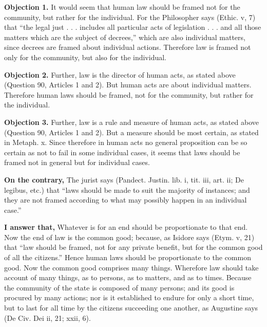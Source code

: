 
\textbf{Objection 1.} It would seem that human law should be framed not for the community, but rather for the individual. For the Philosopher says (Ethic. v, 7) that ``the legal just . . . includes all particular acts of legislation . . . and all those matters which are the subject of decrees,'' which are also individual matters, since decrees are framed about individual actions. Therefore law is framed not only for the community, but also for the individual.

\textbf{Objection 2.} Further, law is the director of human acts, as stated above (Question 90, Articles 1 and 2). But human acts are about individual matters. Therefore human laws should be framed, not for the community, but rather for the individual.

\textbf{Objection 3.} Further, law is a rule and measure of human acts, as stated above (Question 90, Articles 1 and 2). But a measure should be most certain, as stated in Metaph. x. Since therefore in human acts no general proposition can be so certain as not to fail in some individual cases, it seems that laws should be framed not in general but for individual cases.

\textbf{On the contrary,} The jurist says (Pandect. Justin. lib. i, tit. iii, art. ii; De legibus, etc.) that ``laws should be made to suit the majority of instances; and they are not framed according to what may possibly happen in an individual case.''

\textbf{I answer that,} Whatever is for an end should be proportionate to that end. Now the end of law is the common good; because, as Isidore says (Etym. v, 21) that ``law should be framed, not for any private benefit, but for the common good of all the citizens.'' Hence human laws should be proportionate to the common good. Now the common good comprises many things. Wherefore law should take account of many things, as to persons, as to matters, and as to times. Because the community of the state is composed of many persons; and its good is procured by many actions; nor is it established to endure for only a short time, but to last for all time by the citizens succeeding one another, as Augustine says (De Civ. Dei ii, 21; xxii, 6).


